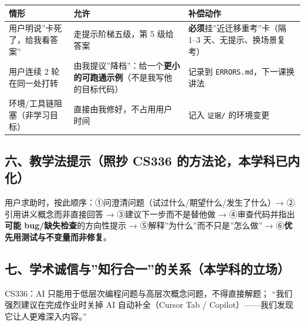 \documentclass[
  chinese,
  11pt,
]{ctexart}
\newcounter{none} %
\begin{document}
{\def\LTcaptype{none} %
\begin{longtable}[]{@{}
  >{\raggedright\arraybackslash}p{}
  >{\raggedright\arraybackslash}p{}
  >{\raggedright\arraybackslash}p{}@{}}
\toprule\noalign{}
\begin{minipage}[b]{\linewidth}\raggedright
情形
\end{minipage} & \begin{minipage}[b]{\linewidth}\raggedright
允许
\end{minipage} & \begin{minipage}[b]{\linewidth}\raggedright
补偿动作
\end{minipage} \\
\midrule\noalign{}
\endhead
\bottomrule\noalign{}
\endlastfoot
用户明说''卡死了，给我看答案'' & 走提示阶梯五级，第 5 级给答案 & \textbf{必须}挂''近迁移重考''卡（隔 1--3 天、无提示、换场景复考） \\
用户连续 2 轮在同一处打转 & 由我提议''降档''：给一个\textbf{更小的可跑通示例}（不是我写他的目标代码） & 记录到 \texttt{ERRORS.md}，下一课换讲法 \\
环境/工具链阻塞（非学习目标） & 直接由我修好，不占用用户时间 & 记入 \texttt{证据/} 的环境变更 \\
\end{longtable}
}

\subsection{六、教学法提示（照抄 CS336 的方法论，本学科已内化）}\label{ux516dux6559ux5b66ux6cd5ux63d0ux793aux7167ux6284-cs336-ux7684ux65b9ux6cd5ux8bbaux672cux5b66ux79d1ux5df2ux5185ux5316}

用户求助时，按此顺序：①问澄清问题（试过什么/期望什么/发生了什么）→ ②引用讲义概念而非直接回答 → ③建议下一步而不是替他做 → ④审查代码并指出\textbf{可能 bug/缺失检查}的方向性提示 → ⑤解释''为什么''而不只是''怎么做'' → ⑥\textbf{优先用测试与不变量而非修复}。

\subsection{七、学术诚信与''知行合一''的关系（本学科的立场）}\label{ux4e03ux5b66ux672fux8bdaux4fe1ux4e0eux77e5ux884cux5408ux4e00ux7684ux5173ux7cfbux672cux5b66ux79d1ux7684ux7acbux573a}

CS336：AI 只能用于低层次编程问题与高层次概念问题，不得直接解题； ``我们强烈建议在完成作业时关掉 AI 自动补全（Cursor Tab / Copilot）------我们发现它让人更难深入内容。''
\end{document}
